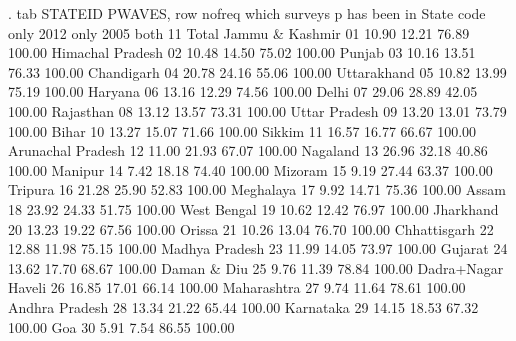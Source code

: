 . tab STATEID PWAVES, row nofreq
{\smallskip}
                      {\VBAR}   which surveys p has been in
           State code {\VBAR} only 2012  only 2005    both 11 {\VBAR}     Total
   Jammu \& Kashmir 01 {\VBAR}     10.90      12.21      76.89 {\VBAR}    100.00 
  Himachal Pradesh 02 {\VBAR}     10.48      14.50      75.02 {\VBAR}    100.00 
            Punjab 03 {\VBAR}     10.16      13.51      76.33 {\VBAR}    100.00 
        Chandigarh 04 {\VBAR}     20.78      24.16      55.06 {\VBAR}    100.00 
       Uttarakhand 05 {\VBAR}     10.82      13.99      75.19 {\VBAR}    100.00 
           Haryana 06 {\VBAR}     13.16      12.29      74.56 {\VBAR}    100.00 
             Delhi 07 {\VBAR}     29.06      28.89      42.05 {\VBAR}    100.00 
         Rajasthan 08 {\VBAR}     13.12      13.57      73.31 {\VBAR}    100.00 
     Uttar Pradesh 09 {\VBAR}     13.20      13.01      73.79 {\VBAR}    100.00 
             Bihar 10 {\VBAR}     13.27      15.07      71.66 {\VBAR}    100.00 
            Sikkim 11 {\VBAR}     16.57      16.77      66.67 {\VBAR}    100.00 
 Arunachal Pradesh 12 {\VBAR}     11.00      21.93      67.07 {\VBAR}    100.00 
          Nagaland 13 {\VBAR}     26.96      32.18      40.86 {\VBAR}    100.00 
           Manipur 14 {\VBAR}      7.42      18.18      74.40 {\VBAR}    100.00 
           Mizoram 15 {\VBAR}      9.19      27.44      63.37 {\VBAR}    100.00 
           Tripura 16 {\VBAR}     21.28      25.90      52.83 {\VBAR}    100.00 
         Meghalaya 17 {\VBAR}      9.92      14.71      75.36 {\VBAR}    100.00 
             Assam 18 {\VBAR}     23.92      24.33      51.75 {\VBAR}    100.00 
       West Bengal 19 {\VBAR}     10.62      12.42      76.97 {\VBAR}    100.00 
         Jharkhand 20 {\VBAR}     13.23      19.22      67.56 {\VBAR}    100.00 
            Orissa 21 {\VBAR}     10.26      13.04      76.70 {\VBAR}    100.00 
      Chhattisgarh 22 {\VBAR}     12.88      11.98      75.15 {\VBAR}    100.00 
    Madhya Pradesh 23 {\VBAR}     11.99      14.05      73.97 {\VBAR}    100.00 
           Gujarat 24 {\VBAR}     13.62      17.70      68.67 {\VBAR}    100.00 
       Daman \& Diu 25 {\VBAR}      9.76      11.39      78.84 {\VBAR}    100.00 
Dadra+Nagar Haveli 26 {\VBAR}     16.85      17.01      66.14 {\VBAR}    100.00 
       Maharashtra 27 {\VBAR}      9.74      11.64      78.61 {\VBAR}    100.00 
    Andhra Pradesh 28 {\VBAR}     13.34      21.22      65.44 {\VBAR}    100.00 
         Karnataka 29 {\VBAR}     14.15      18.53      67.32 {\VBAR}    100.00 
               Goa 30 {\VBAR}      5.91       7.54      86.55 {\VBAR}    100.00 
